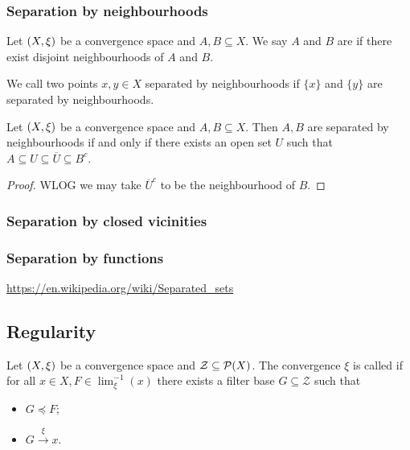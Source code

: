 \subsubsection{Separation by neighbourhoods}
\begin{definition}
Let $\sSet{X,\xi}$ be a convergence space and $A,B\subseteq X$. We say $A$ and $B$ are  if there exist disjoint neighbourhoods of $A$ and $B$.

We call two points $x,y\in X$ separated by neighbourhoods if $\{x\}$ and $\{y\}$ are separated by neighbourhoods.
\end{definition}

\begin{lemma} \label{neighbourhoodSeparationLemma}
Let $\sSet{X,\xi}$ be a convergence space and $A,B\subseteq X$. Then $A,B$ are separated by neighbourhoods \textup{if and only if} there exists an open set $U$ such that $A \subseteq U \subseteq \overline{U} \subseteq B^c$.
\end{lemma}
\begin{proof}
WLOG we may take $\overline{U}^c$ to be the neighbourhood of $B$.
\end{proof}

\subsubsection{Separation by closed vicinities}
\subsubsection{Separation by functions}
\url{https://en.wikipedia.org/wiki/Separated_sets}

\subsection{Regularity}
\begin{definition}
Let $\sSet{X,\xi}$ be a convergence space and $\mathcal{Z} \subseteq \operatorname{\mathcal{P}}(X)$. The convergence $\xi$ is called  if for all $x\in X, F\in\lim_\xi^{-1}(x)$ there exists a filter base $G\subseteq \mathcal{Z}$ such that
\begin{itemize}
\item $G \preceq F$;
\item $G \overset{\xi}{\longrightarrow} x$.
\end{itemize}
\end{definition}

